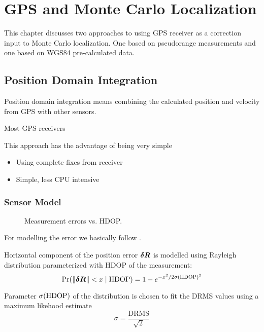 \chapter{GPS and Monte Carlo Localization}
\label{chap:gps-and-mcl}

This chapter discusses two approaches to using GPS receiver as a correction input
to Monte Carlo localization. One based on pseudorange measurements and one based on
WGS84 pre-calculated data.



\section{Position Domain Integration}
Position domain integration means combining the calculated position and velocity from
GPS with other sensors.

Most GPS receivers 

This approach has the advantage of being very simple 

\begin{itemize}
\item Using complete fixes from receiver
\item Simple, less CPU intensive
\end{itemize}

\subsection{Sensor Model}
\label{sec:wgs84-hdop-error}

\begin{figure}[htp]
	\centering
	\noindent{}
	\caption{Measurement errors vs. HDOP.}
	\label{fig:wgs84-hdop-error}
\end{figure}

For modelling the error we basically follow \cite{www-wilson}.

Horizontal component of the position error  \(\bm{\delta R}\) is modelled using Rayleigh distribution
parameterized with HDOP of the measurement:
\begin{equation}
	\operatorname{\mathrm{Pr}}(\lVert\bm{\delta R}\rVert < x \mid \mathrm{HDOP}) =
		1 - e^{-x^2/2\sigma(\mathrm{HDOP})^2}
\end{equation}

Parameter \(\sigma(\mathrm{HDOP})\) of the distribution is chosen to fit the DRMS values using a maximum likehood estimate
\begin{equation}
	\sigma = \frac{\mathrm{DRMS}}{\sqrt{2}}
\end{equation}

